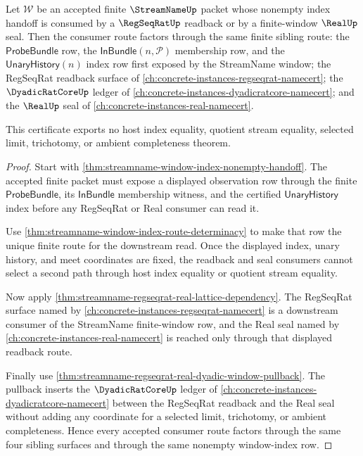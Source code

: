 \begin{theorem}
\label{thm:streamname-window-index-sibling-route-certificate}
Let $\mathcal W$ be an accepted finite $\StreamNameUp$ packet whose nonempty
index handoff is consumed by a $\RegSeqRatUp$ readback or by a finite-window
$\RealUp$ seal. Then the consumer route factors through the same finite
sibling route: the $\mathsf{ProbeBundle}$ row, the
$\mathsf{InBundle}(n,\mathcal P)$ membership row, and the
$\mathsf{UnaryHistory}(n)$ index row first exposed by the StreamName window;
the RegSeqRat readback surface of
\autoref{ch:concrete-instances-regseqrat-namecert}; the $\DyadicRatCoreUp$
ledger of \autoref{ch:concrete-instances-dyadicratcore-namecert}; and the
$\RealUp$ seal of \autoref{ch:concrete-instances-real-namecert}.

This certificate exports no host index equality, quotient stream equality,
selected limit, trichotomy, or ambient completeness theorem.
\end{theorem}
\begin{proof}
Start with \autoref{thm:streamname-window-index-nonempty-handoff}. The
accepted finite packet must expose a displayed observation row through the
finite $\mathsf{ProbeBundle}$, its $\mathsf{InBundle}$ membership witness, and
the certified $\mathsf{UnaryHistory}$ index before any RegSeqRat or Real
consumer can read it.

Use \autoref{thm:streamname-window-index-route-determinacy} to make that row
the unique finite route for the downstream read. Once the displayed index,
unary history, and meet coordinates are fixed, the readback and seal consumers
cannot select a second path through host index equality or quotient stream
equality.

Now apply \autoref{thm:streamname-regseqrat-real-lattice-dependency}. The
RegSeqRat surface named by \autoref{ch:concrete-instances-regseqrat-namecert}
is a downstream consumer of the StreamName finite-window row, and the Real
seal named by \autoref{ch:concrete-instances-real-namecert} is reached only
through that displayed readback route.

Finally use \autoref{thm:streamname-regseqrat-real-dyadic-window-pullback}.
The pullback inserts the $\DyadicRatCoreUp$ ledger of
\autoref{ch:concrete-instances-dyadicratcore-namecert} between the RegSeqRat
readback and the Real seal without adding any coordinate for a selected limit,
trichotomy, or ambient completeness. Hence every accepted consumer route
factors through the same four sibling surfaces and through the same nonempty
window-index row.
\end{proof}

